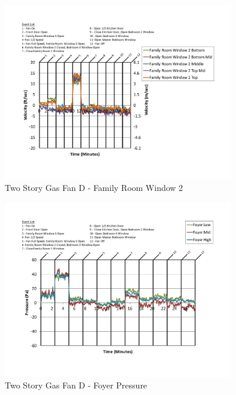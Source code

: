 \documentclass{article}
\begin{document}
\begin{appendices}
	\begin{figure}[H]
		\centering
		\includegraphics[height=3.05in,trim=0.67in 1.1in 0.67in 0.8in,clip=true]{0_Images/Results_Charts/ColdFlow/Two_Story/Gas/D/Family_Room_Window_2.pdf}
		\caption{Two Story Gas Fan D - Family Room Window 2}
	\end{figure}
 

	\begin{figure}[H]
		\centering
		\includegraphics[height=3.05in,trim=0.67in 1.1in 0.67in 0.8in,clip=true]{0_Images/Results_Charts/ColdFlow/Two_Story/Gas/D/Foyer_Pressure.pdf}
		\caption{Two Story Gas Fan D - Foyer Pressure}
	\end{figure}
 
	\clearpage


\end{appendices}
\end{document}
